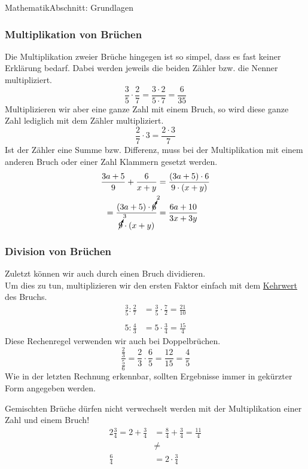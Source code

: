 \documentclass[11pt,twocolumn,oneside,openany,headings=optiontotoc,11pt,numbers=noenddot]{article}
\begin{document}
\begin{worksheet}{}{Mathematik}{Abschnitt: Grundlagen}
		\subsubsection*{Multiplikation von Brüchen}
		Die Multiplikation zweier Brüche hingegen ist so simpel, dass es fast keiner Erklärung bedarf. Dabei werden jeweils die beiden Zähler bzw. die Nenner multipliziert.
		\[\frac{3}{5}\cdot{}\frac{2}{7} = \frac{3\cdot{}2}{5\cdot{}7} = \frac{6}{35}\]
		Multiplizieren wir aber eine ganze Zahl mit einem Bruch, so wird diese ganze Zahl lediglich mit dem Zähler multipliziert.
		\[\frac{2}{7}\cdot{}3 = \frac{2\cdot{}3}{7}\]
		\normalcolor{} Ist der Zähler eine Summe bzw. Differenz, muss bei der Multiplikation mit einem anderen Bruch oder einer Zahl Klammern gesetzt werden.
		\begin{align*}
			\frac{3a + 5}{9} + \frac{6}{x+y} & = \frac{(3a+5)\cdot{}6}{9\cdot{}(x+y)}\\
			= \frac{(3a+5)\cdot{}\cancelto{2}{6}}{\cancelto{3}{9}\cdot{}(x+y)} & = \frac{6a+10}{3x+3y}
		\end{align*}
		\subsubsection*{Division von Brüchen}
		Zuletzt können wir auch durch einen Bruch dividieren.\\
		Um dies zu tun, multiplizieren wir den ersten Faktor einfach mit dem \underline{Kehrwert} des Bruchs.
		\begin{align*}
			\frac{3}{5}:\frac{2}{7} & = \frac{3}{5}\cdot{}\frac{7}{2} = \frac{21}{10}\\
			\\
			5:\frac{4}{3} & = 5\cdot{}\frac{3}{4} = \frac{15}{4}
		\end{align*}
		Diese Rechenregel verwenden wir auch bei Doppelbrüchen.
		\[\frac{\frac{2}{3}}{\frac{5}{6}} = \frac{2}{3}\cdot{}\frac{6}{5} = \frac{12}{15} = \frac{4}{5}\]
		Wie in der letzten Rechnung erkennbar, sollten Ergebnisse immer in gekürzter Form angegeben werden.\\
		\par\noindent
		\normalcolor{} Gemischten Brüche dürfen nicht verwechselt werden mit der Multiplikation einer Zahl und einem Bruch!
		\begin{align*}
			2\frac{3}{4} = 2 + \frac{3}{4} & = \frac{8}{4} +\frac{3}{4} = \frac{11}{4}\\
			& \neq\\
			\frac{6}{4} & = 2\cdot{}\frac{3}{4}
		\end{align*}

\end{worksheet}
\end{document}
